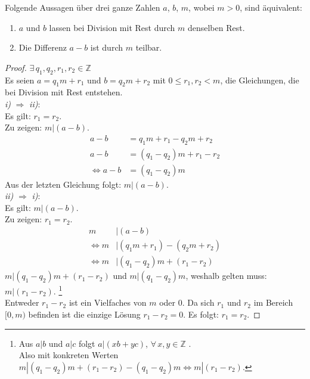 \begin{lemma}
  Folgende Aussagen über drei ganze Zahlen $a$, $b$, $m$, wobei $m > 0$, sind äquivalent:
  \begin{enumerate}[label=\roman*), itemsep = 0pt]
    \item $a$ und $b$ lassen bei Division mit Rest durch $m$ denselben Rest.
    \item Die Differenz $a - b$ ist durch $m$ teilbar.
  \end{enumerate}
\end{lemma}
\begin{proof}
  $\exists \, q_1,q_2,r_1,r_2 \in \mathbb{Z}$ \\
  Es seien $a = q_1m + r_1$ und $b = q_2m + r_2$ mit $0 \leq r_1,r_2 < m$,
  die Gleichungen, die bei Division mit Rest entstehen. \\
  \textit{i)} $\Rightarrow$ \textit{ii)}: \\
  Es gilt: $r_1 = r_2$. \\
  Zu zeigen: $m|(a-b)$.
  \begin{align*}
    a - b      & = q_1m + r_1 - q_2m + r_2  \\
    a - b      & = (q_1 - q_2)m + r_1 - r_2 \\
    \iff a - b & = (q_1 - q_2)m
  \end{align*}
  Aus der letzten Gleichung folgt: $m | (a - b)$. \\
  \textit{ii)} $\Rightarrow$ \textit{i)}: \\
  Es gilt: $m | (a - b)$. \\
  Zu zeigen: $r_1 = r_2$.
  \begin{align*}
    m                 & | (a - b)                     \\
    \Leftrightarrow m & | (q_1m + r_1) - (q_2m + r_2) \\
    \Leftrightarrow m & | (q_1 - q_2)m + (r_1 - r_2)
  \end{align*}
  $m|(q_1 - q_2)m + (r_1 - r_2)$ und $m|(q_1 - q_2)m$, weshalb gelten muss: $m|(r_1 - r_2)$.
  \footnote{Aus $a|b$ und $a|c$ folgt $a|(xb + yc)$,
    $\forall \, x,y \in \mathbb{Z}$ \parencite[23]{BOOK:numberTheory}. \\
    Also mit konkreten Werten $m|(q_1 - q_2)m + (r_1 - r_2) - (q_1 - q_2)m \Leftrightarrow m|(r_1 - r_2)$.} \\
  Entweder $r_1 - r_2$ ist ein Vielfaches von $m$ oder 0.
  Da sich $r_1$ und $r_2$ im Bereich
  $[0,m)$ befinden ist die einzige Lösung $r_1 - r_2 = 0$. Es folgt: $r_1 = r_2$.
\end{proof}

